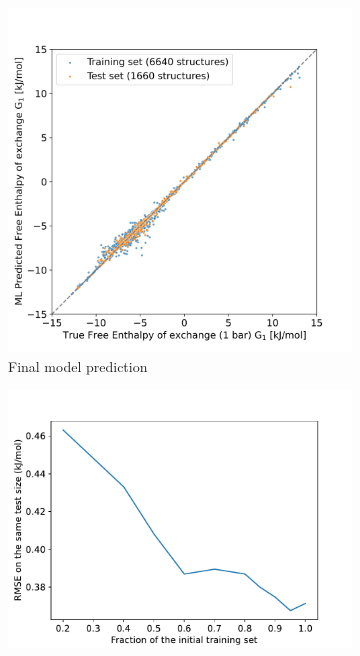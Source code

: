 \documentclass[main]{subfiles}
\begin{document}
\begin{figure}[ht]
\centering
  \begin{subfigure}[b]{0.48\textwidth}
  \centering
    \includegraphics[width=\textwidth]{figures/4-ml/main/Scatterplot_G1_prediction.jpeg}
    \caption{Final model prediction}\label{fgr:G1_prediction}
  \end{subfigure}
  \begin{subfigure}[b]{0.48\textwidth}
  \centering
    \includegraphics[width=\textwidth]{figures/4-ml/main/training_curve.pdf}

\end{subfigure}
\end{figure}
\end{document}
